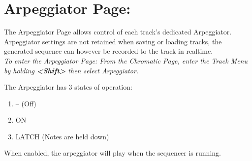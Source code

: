 \chapter{Arpeggiator Page:}
The Arpeggiator Page allows control of each track's dedicated Arpeggiator. Arpeggiator settings are not retained when saving or loading tracks, the generated sequence can however be recorded to the track in realtime.
\\
\textit{To enter the Arpeggiator Page: From the Chromatic Page, enter the Track Menu by holding \textbf{<Shift>} then select Arpeggiator. }

The Arpeggiator has 3 states of operation:
\begin{enumerate}
    \item -- (Off)
    \item ON
    \item LATCH (Notes are held down)
\end{enumerate}

When enabled, the arpeggiator will  play when the sequencer is running. 

